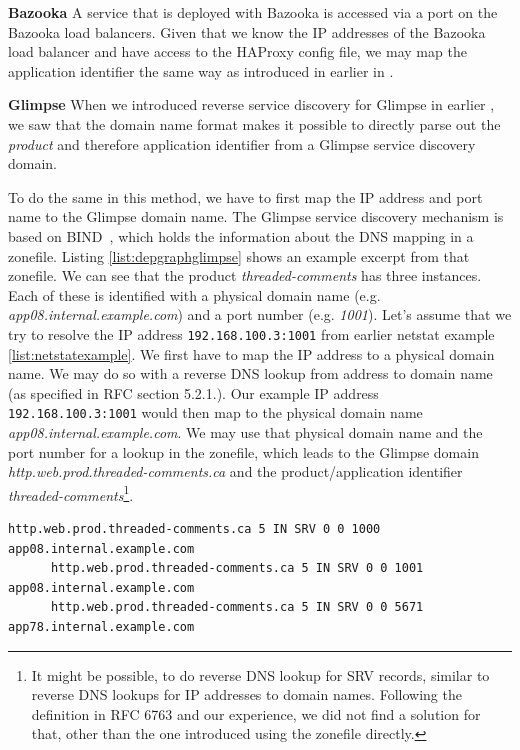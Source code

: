 \textbf{Bazooka} A service that is deployed with Bazooka is accessed via a port on the Bazooka load balancers. Given that we know the IP addresses of the Bazooka load balancer and have access to the HAProxy config file, we may map the application identifier the same way as introduced in earlier in .

\textbf{Glimpse} When we introduced reverse service discovery for Glimpse in earlier , we saw that the domain name format makes it possible to directly parse out the \emph{product} and therefore application identifier from a Glimpse service discovery domain.

To do the same in this method, we have to first map the IP address and port name to the Glimpse domain name. The Glimpse service discovery mechanism is based on BIND~\cite{bind}, which holds the information about the DNS mapping in a zonefile. Listing \ref{list:depgraphglimpse} shows an example excerpt from that zonefile. We can see that the product \emph{threaded-comments} has three instances. Each of these is identified with a physical domain name (e.g. \emph{app08.internal.example.com}) and a port number (e.g. \emph{1001}). Let's assume that we try to resolve the IP address \lstinline{192.168.100.3:1001} from earlier netstat example \autoref{list:netstatexample}. We first have to map the IP address to a physical domain name. We may do so with a reverse DNS lookup from address to domain name (as specified in RFC \cite{rfc1034} section 5.2.1.). Our example IP address \lstinline{192.168.100.3:1001} would then map to the physical domain name \emph{app08.internal.example.com}. We may use that physical domain name and the port number for a lookup in the zonefile, which leads to the Glimpse domain \emph{http.web.prod.threaded-comments.ca} and the product/application identifier \emph{threaded-comments}\footnote{It might be possible, to do reverse DNS lookup for SRV records, similar to reverse DNS lookups for IP addresses to domain names. Following the definition in RFC 6763 \cite{rfc6763} and our experience, we did not find a solution for that, other than the one introduced using the zonefile directly.}.

\begin{adjustwidth}{-0.9in}{-.8in}
    \begin{lstlisting}[caption=Glimpse zonefile example excerpt,label=list:depgraphglimpse]
      http.web.prod.threaded-comments.ca 5 IN SRV 0 0 1000 app08.internal.example.com
      http.web.prod.threaded-comments.ca 5 IN SRV 0 0 1001 app08.internal.example.com
      http.web.prod.threaded-comments.ca 5 IN SRV 0 0 5671 app78.internal.example.com
    \end{lstlisting}
\end{adjustwidth}

